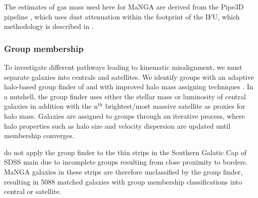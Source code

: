 The estimates of gas mass used here for MaNGA are derived from the Pipe3D pipeline \citep{pipe3Da, pipe3Dvac}, which uses dust attenuation within the footprint of the IFU, which methodology is described in \citet{barrera2018}.

\subsubsection{Group membership} \label{sec:group_def}
To investigate different pathways leading to kinematic misalignment, we must separate galaxies into centrals and satellites. We identify groups with an adaptive halo-based group finder of \citet{yang2005,yang2007} and with improved halo mass assigning techniques \citep[see;][for details and application to SDSS]{lim2017}. In a nutshell, the group finder uses either the stellar mass or luminosity of central galaxies in addition with the $\mathrm{n^{th}}$ brightest/most massive satellite as proxies for halo mass. Galaxies are assigned to groups through an iterative process, where halo properties such as halo size and velocity dispersion are updated until membership converges. 


\citet{lim2017} do not apply the group finder to the thin strips in the Southern Galatic Cap of SDSS main due to incomplete groups resulting from close proximity to borders. MaNGA galaxies in these strips are therefore unclassified by the group finder, resulting in 5088 matched galaxies with group membership classifications into central or satellite. 

